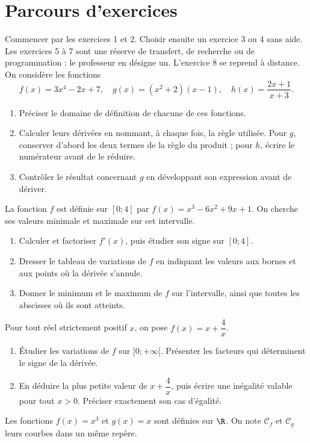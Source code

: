 \section*{Parcours d’exercices}\label{C06-PARC}
Commencer par les exercices 1 et 2. Choisir ensuite un exercice 3 ou 4 sans aide. Les exercices 5 à 7 sont une réserve de transfert, de recherche ou de programmation : le professeur en désigne un. L’exercice 8 se reprend à distance.
\begingroup
{}
On considère les fonctions\[f(x)=3x^4-2x+7,\quad g(x)=(x^2+2)(x-1),\quad h(x)=\dfrac{2x+1}{x+3}.\]
\begin{enumerate}[label=\arabic*.]
\item Préciser le domaine de définition de chacune de ces fonctions.
\item Calculer leurs dérivées en nommant, à chaque fois, la règle utilisée. Pour $g$, conserver d’abord les deux termes de la règle du produit ; pour $h$, écrire le numérateur avant de le réduire.
\item Contrôler le résultat concernant $g$ en développant son expression avant de dériver.
\end{enumerate}
La fonction $f$ est définie sur $[0;4]$ par $f(x)=x^3-6x^2+9x+1$. On cherche ses valeurs minimale et maximale sur cet intervalle.
\begin{enumerate}[label=\arabic*.]
\item Calculer et factoriser $f\prime(x)$, puis étudier son signe sur $[0;4]$.
\item Dresser le tableau de variations de $f$ en indiquant les valeurs aux bornes et aux points où la dérivée s’annule.
\item Donner le minimum et le maximum de $f$ sur l’intervalle, ainsi que toutes les abscisses où ils sont atteints.
\end{enumerate}
Pour tout réel strictement positif $x$, on pose $f(x)=x+\dfrac4x$.
\begin{enumerate}[label=\arabic*.]
\item Étudier les variations de $f$ sur $]0;+\infty[$. Présenter les facteurs qui déterminent le signe de la dérivée.
\item En déduire la plus petite valeur de $x+\dfrac4x$, puis écrire une inégalité valable pour tout $x>0$. Préciser exactement son cas d’égalité.
\end{enumerate}
Les fonctions $f(x)=x^3$ et $g(x)=x$ sont définies sur $\R$. On note $\mathcal C_f$ et $\mathcal C_g$ leurs courbes dans un même repère.
